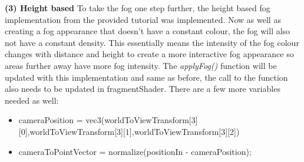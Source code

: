 \documentclass[a4 paper, 12pt]{article}
\begin{document}
\textbf{(3) Height based}
To take the fog one step further, the height based fog implementation from the provided tutorial was implemented. Now as well as creating a fog appearance that doesn't have a constant colour, the fog will also not have a constant density. This essentially means the intensity of the fog colour changes with distance and height to create a more interactive fog appearance so areas further away have more fog intensity. The \textit{applyFog()} function will be updated with this implementation and same as before, the call to the function also needs to be updated in fragmentShader. There are a few more variables needed as well:
    \begin{itemize}
        \item cameraPosition = vec3(worldToViewTransform[3][0],worldToViewTransform[3][1],worldToViewTransform[3][2])
        \item cameraToPointVector = normalize(positionIn - cameraPosition);
    \end{itemize}
\end{document}
